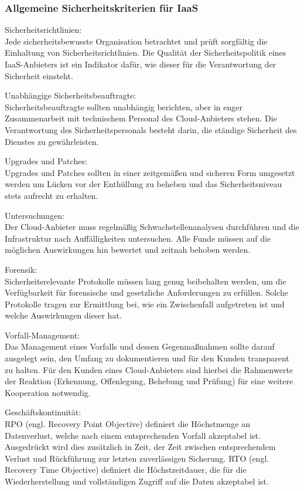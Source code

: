\documentclass[12pt,a4paper,bibliography=totocnumbered,listof=totocnumbered]{scrartcl}
\begin{document}
\subsubsection{Allgemeine Sicherheitskriterien für IaaS}
\begin{compactitem}
\item Sicherheitsrichtlinien:\\
Jede sicherheitsbewusste Organisation betrachtet und prüft sorgfältig die Einhaltung von Sicherheitsrichtlinien. Die Qualität der Sicherheitspolitik eines IaaS-Anbieters ist ein Indikator dafür, wie dieser für die Verantwortung der Sicherheit einsteht.
\item Unabhängige Sicherheitsbeauftragte:\\
Sicherheitsbeauftragte sollten unabhängig berichten, aber in enger Zusammenarbeit mit technischem Personal des Cloud-Anbieters stehen. Die Verantwortung des Sicherheitspersonals besteht darin, die ständige Sicherheit des Dienstes zu gewährleisten.
\item Upgrades und Patches:\\
Upgrades und Patches sollten in einer zeitgemäßen und sicheren Form umgesetzt werden um Lücken vor der Enthüllung zu beheben und das Sicherheitsniveau stets aufrecht zu erhalten.
\item Untersuchungen:\\
Der Cloud-Anbieter muss regelmäßig Schwachstellenanalysen durchführen und die Infrastruktur nach Auffälligkeiten untersuchen. Alle Funde müssen auf die möglichen Auswirkungen hin bewertet und zeitnah behoben werden.
\item Forensik:\\
Sicherheitsrelevante Protokolle müssen lang genug beibehalten werden, um die Verfügbarkeit für forensische und gesetzliche Anforderungen zu erfüllen. Solche Protokolle tragen zur Ermittlung bei, wie ein Zwischenfall aufgetreten ist und welche Auswirkungen dieser hat.
\item Vorfall-Management:\\
Das Management eines Vorfalls und dessen Gegenmaßnahmen sollte darauf ausgelegt sein, den Umfang zu dokumentieren und für den Kunden transparent zu halten. Für den Kunden eines Cloud-Anbieters sind hierbei die Rahmenwerte der Reaktion (Erkennung, Offenlegung, Behebung und Prüfung) für eine weitere Kooperation notwendig.
\item Geschäftskontinuität:\\
RPO (engl. Recovery Point Objective) definiert die Höchstmenge an Datenverlust, welche nach einem entsprechenden Vorfall akzeptabel ist. Ausgedrückt wird dies zusätzlich in Zeit, der Zeit zwischen entsprechendem Verlust und Rückführung zur letzten zuverlässigen Sicherung. RTO (engl. Recovery Time Objective) definiert die Höchstzeitdauer, die für die Wiederherstellung und vollständigen Zugriff auf die Daten akzeptabel ist.
\end{compactitem}
\end{document}
